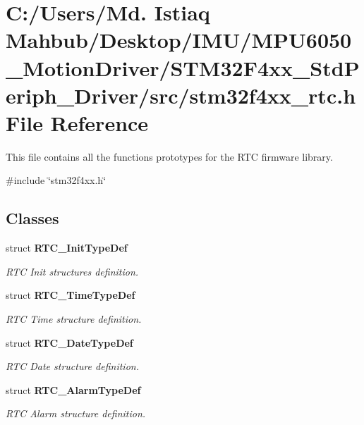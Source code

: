 \section{C\+:/\+Users/\+Md. Istiaq Mahbub/\+Desktop/\+I\+M\+U/\+M\+P\+U6050\+\_\+\+Motion\+Driver/\+S\+T\+M32\+F4xx\+\_\+\+Std\+Periph\+\_\+\+Driver/src/stm32f4xx\+\_\+rtc.h File Reference}
\label{stm32f4xx__rtc_8h}


This file contains all the functions prototypes for the R\+TC firmware library.  


{\ttfamily \#include \char`\"{}stm32f4xx.\+h\char`\"{}}\newline
\subsection*{Classes}
\begin{DoxyCompactItemize}
\item 
struct \textbf{ R\+T\+C\+\_\+\+Init\+Type\+Def}
\begin{DoxyCompactList}\small\item\em R\+TC Init structures definition. \end{DoxyCompactList}\item 
struct \textbf{ R\+T\+C\+\_\+\+Time\+Type\+Def}
\begin{DoxyCompactList}\small\item\em R\+TC Time structure definition. \end{DoxyCompactList}\item 
struct \textbf{ R\+T\+C\+\_\+\+Date\+Type\+Def}
\begin{DoxyCompactList}\small\item\em R\+TC Date structure definition. \end{DoxyCompactList}\item 
struct \textbf{ R\+T\+C\+\_\+\+Alarm\+Type\+Def}
\begin{DoxyCompactList}\small\item\em R\+TC Alarm structure definition. \end{DoxyCompactList}\end{DoxyCompactItemize}
